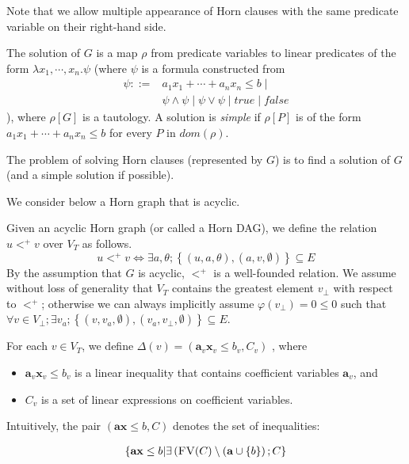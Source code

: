 \documentclass[a4paper,12pt]{article}
\begin{document}
Note that we allow multiple appearance of Horn clauses with the same
predicate variable on their right-hand side.

The solution of $G$ is a map $\rho$ from predicate variables to linear
predicates of the form $\lambda x_1, \cdots ,x_n. \psi $ (where $\psi$
is a formula constructed from
\begin{align*}
\psi ::= & a_1 x_1 + \cdots + a_n x_n \leq b \mid \\
& \psi \wedge \psi \mid \psi \vee \psi \mid true \mid false
\end{align*}
), where $\rho[G]$ is a tautology. A solution is \textit{simple} if
$\rho[P]$ is of the form $a_1 x_1 + \cdots + a_n x_n \leq b$ for every
$P$ in $dom(\rho)$.

The problem of solving Horn clauses (represented by $G$) is to find a
solution of $G$ (and a simple solution if possible).

We consider below a Horn graph that is acyclic.

Given an acyclic Horn graph (or called a Horn DAG), we define the
relation $u <^+ v$ over $V_T$ as follows.
\[ u <^+ v \Longleftrightarrow \exists a, \theta; \left\lbrace (u,a,\theta), (a,v,\emptyset) \right\rbrace \subseteq E \]
By the assumption that $G$ is acyclic, $<^+$ is a well-founded
relation. We assume without loss of generality that $V_T$ contains the
greatest element $v_\bot$ with respect to $<^+$; otherwise we can
always implicitly assume $\varphi(v_\bot) = 0 \leq 0$ such that $\forall v \in V_\bot; \exists v_a; \left\lbrace (v, v_a, \emptyset), (v_a, v_\bot, \emptyset) \right\rbrace \subseteq E $.

For each $v \in V_T$, we define
$\Delta(v) = (\mathbf{a}_v \mathbf{x}_v \leq b_v, C_v)$
, where
\begin{itemize}
\item $\mathbf{a}_v \mathbf{x}_v \leq b_v$ is a linear inequality that
  contains coefficient variables $\mathbf{a}_v$, and
\item $C_v$ is a set of linear expressions on coefficient variables.
\end{itemize}
Intuitively, the pair $(\mathbf{a} \mathbf{x} \leq b, C)$ denotes the
set of inequalities:

\begin{align*}
\left\lbrace
 \mathbf{a} \mathbf{x} \leq b \middle|
 \exists \left( \textsc{FV}(C)
  \setminus (\mathbf{a} \cup \left\lbrace b \right\rbrace
 \right); C
\right\rbrace
\end{align*}
\end{document}

